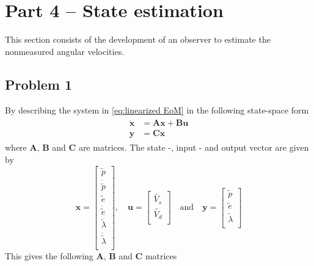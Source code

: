 \section{Part 4 -- State estimation}
This section consists of the development of an observer to estimate the
nonmeasured angular velocities.
%
\subsection{Problem 1}
By describing the system in \cref{eq:linearized EoM} in the following
state-space form
%
\begin{align}
  \begin{split}
    \dot{\bm{x}} &= \bm{Ax} + \bm{Bu} \\
    \bm{y} &= \bm{Cx}
  \end{split}
\end{align}
%
where  $\bm{A}$, $\bm{B}$ and $\bm{C}$ are matrices. The state -,
input - and output vector are given by
%
\begin{equation}
  \label{eq:state_space_vectors}
  \bm{x} =
  \begin{bmatrix}
    \tilde{p} \\
    \dot{\tilde{p}} \\
    \tilde{e} \\
    \dot{\tilde{e}} \\
    \tilde{\lambda} \\
    \dot{\tilde{\lambda}} \\
  \end{bmatrix}
  , \quad \bm{u} =
  \begin{bmatrix}
    \tilde{V_s} \\
    \tilde{V_d} \\
  \end{bmatrix}
  \quad \text{and} \quad \bm{y} =
  \begin{bmatrix}
    \tilde{p} \\
    \tilde{e} \\
    \tilde{\lambda}\\
  \end{bmatrix}
\end{equation}
%
This gives the following $\bm{A}$, $\bm{B}$ and $\bm{C}$ matrices
%
